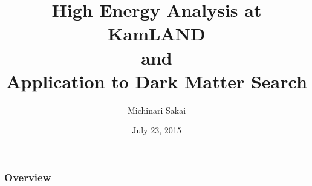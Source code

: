 \documentclass[14pt]{beamer}
\title[KamLAND]{High Energy Analysis at KamLAND\\ and\\ Application to Dark
	Matter Search}
\author{Michinari Sakai} %
\institute[UH] %
{
University of Hawaii, Manoa \\ %
\medskip
\textit{michinar@hawaii.edu} %
}
\date{July 23, 2015}
\begin{document}
\begin{frame}
\titlepage %
\end{frame}

\begin{frame}
\frametitle{Overview} %
\tableofcontents %
\end{frame}



\end{document}
